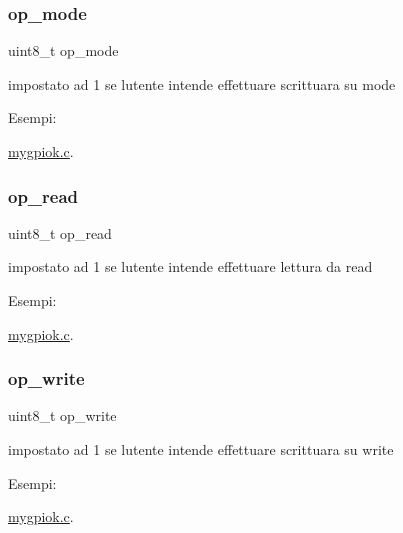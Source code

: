 \subsubsection{\texorpdfstring{op\+\_\+mode}{op\_mode}}
{\footnotesize\ttfamily uint8\+\_\+t op\+\_\+mode}



impostato ad 1 se l\textquotesingle{}utente intende effettuare scrittuara su mode 

\begin{Desc}
\item[Esempi\+: ]\par
\hyperlink{mygpiok_8c-example}{mygpiok.\+c}.\end{Desc}
\mbox{\label{structparam__t_ae66d5c3154a115636a63227b7489a6eb}} 
\subsubsection{\texorpdfstring{op\+\_\+read}{op\_read}}
{\footnotesize\ttfamily uint8\+\_\+t op\+\_\+read}



impostato ad 1 se l\textquotesingle{}utente intende effettuare lettura da read 

\begin{Desc}
\item[Esempi\+: ]\par
\hyperlink{mygpiok_8c-example}{mygpiok.\+c}.\end{Desc}
\mbox{\label{structparam__t_a67752de733f167918a4e966354183a69}} 
\subsubsection{\texorpdfstring{op\+\_\+write}{op\_write}}
{\footnotesize\ttfamily uint8\+\_\+t op\+\_\+write}



impostato ad 1 se l\textquotesingle{}utente intende effettuare scrittuara su write 

\begin{Desc}
\item[Esempi\+: ]\par
\hyperlink{mygpiok_8c-example}{mygpiok.\+c}.\end{Desc}
\mbox{\label{structparam__t_a09e0cff25312ab7f748a3063c038a2d9}} 
